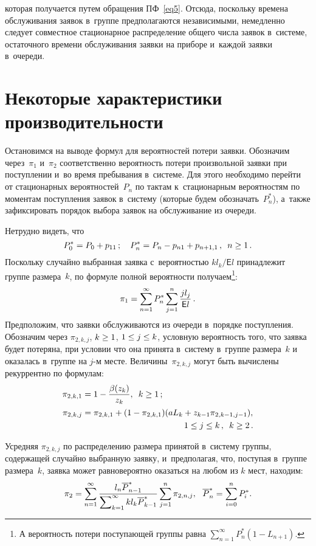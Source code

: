 \begin{multicols}{2}
\noindent  
которая получается путем обращения ПФ~\eqref{eq5}. Отсюда, поскольку 
времена обслуживания заявок в~группе
предполагаются независимыми, немедленно
следует совместное стационарное распределение общего числа
заявок в~системе, остаточного времени обслуживания
заявки на приборе и~каждой заявки в~очереди.

\section{Некоторые характеристики производительности}

Остановимся на выводе формул для вероят\-ностей потери заявки.
Обозначим через~$\pi_1$ и~$\pi_2$ соответственно вероятность
потери произвольной заявки при поступлении и~во время пребывания 
в~системе.
Для этого необходимо перейти от стационарных вероятностей~$P_n$
по тактам к~стационарным вероятностям по моментам
поступления заявок в~систему (которые будем обозначать~$P^*_n$),
а~также зафиксировать порядок выбора заявок на обслуживание из очереди.

Нетрудно видеть, что 
$$P^*_0\hm=P_0\hm+p_{11}\,;\quad P^*_n\hm=P_n\hm-
p_{n1}\hm+p_{n+1,1}\,,\enskip n \hm\ge 1\,.
$$
Поскольку случайно выбранная заявка с~вероятностью $kl_k/\mathsf{E}l$
принадлежит группе размера~$k$, по формуле полной вероятности
получаем\footnote{А вероятность потери
поступающей группы равна $\sum\nolimits_{n=1}^\infty P^*_n (1-L_{n+1})$.}: 
$$\pi_1=\sum\limits_{n=1}^\infty P^*_n \sum\limits_{j=1}^n \displaystyle\frac{\displaystyle j l_j \mathstrut}{\displaystyle \mathsf{E}l\mathstrut}\,.
$$
Предположим, что заявки обслуживаются из очереди в~порядке поступления.
Обозначим через $\pi_{2,k,j}$, $k\hm\ge 1$, $1\hm \le j \hm\le k$, 
условную вероятность того, что заявка будет потеряна, при условии что 
она принята в~сис\-те\-му в~группе размера~$k$ и
оказалась в~группе на $j$-м месте. Величины~$\pi_{2,k,j}$ могут быть
вычислены рекуррентно по формулам:
\begin{align*}
\pi_{2,k,1} &= 1- \fr{\beta(z_k)}{z_k}, \enskip k \ge 1\,;\\
\pi_{2,k,j} &=\pi_{2,k,1}+ (1-\pi_{2,k,1})(aL_k + z_{k-1} \pi_{2,k-1,j-1}),\\ 
&\hspace*{42mm}
 1 \le j \le k\,, \enskip k \ge 2\,.
\end{align*}

\noindent 
Усредняя $\pi_{2,k,j}$ по распределению
размера принятой в~систему группы, содержащей случайно выбранную заявку,
и~предполагая, что, поступая в~группе размера~$k$, заявка
может равновероятно оказаться на любом из $k$ мест, находим:
$$
\pi_2= \sum\limits_{n=1}^\infty 
\displaystyle\frac{\displaystyle l_n {\overline P}^*_{n-1} \mathstrut}{\displaystyle \sum\nolimits_{k=1}^\infty k l_k 
{\overline P}^*_{k-1} \mathstrut}
\sum\limits_{j=1}^n \pi_{2,n,j},
\ \ {\overline P}^*_n=\sum\limits_{i=0}^n P^*_{i}.
$$


\end{multicols}
